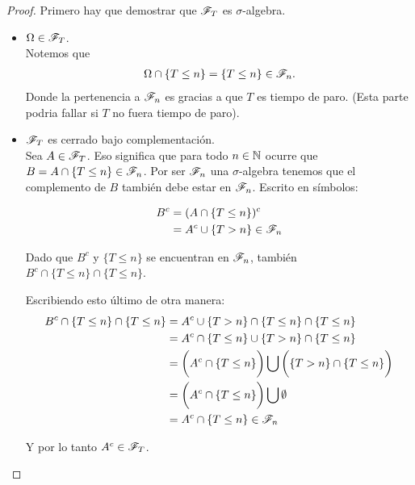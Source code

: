 \begin{proof}
		Primero hay que demostrar que ${\mathscr{F}_T}$ es ${\sigma}$-algebra.\\
		
		\begin{itemize}
			\item ${\Omega \in \mathscr{F}_T}$. \\
			
				Notemos que 
				\begin{align}
					\Omega \cap \{T \leq n\} = \{T \leq n\} \in \mathscr{F}_n.
				\end{align}
				Donde la pertenencia a ${\mathscr{F}_n}$ es gracias a que ${T}$ es tiempo de paro. (Esta parte podria fallar si ${T}$ no fuera tiempo de paro).\\
			
			\item ${\mathscr{F}_T}$ es cerrado bajo complementación.\\
			
				Sea ${A \in \mathscr{F}_T}$. Eso significa que para todo ${n \in  \mathbb{N}}$ ocurre que ${B = A \cap \{ T \leq n \} \in \mathscr{F}_n}$. Por ser ${\mathscr{F}_n}$
								una ${\sigma}$-algebra tenemos que el complemento de ${B}$ también debe estar en ${\mathscr{F}_n}$. Escrito en símbolos:
				
				\begin{align}
					B^c 	&= (A   \cap \{ T \leq n \})^c \\
							&=  A^c \cup \{ T > n \} \in \mathscr{F}_n
				\end{align}
				
				Dado que ${B^c}$ y ${\{ T \leq n \}}$ se encuentran en ${\mathscr{F}_n}$, también ${B^c \cap \{ T \leq n \} \cap \{ T \leq n \}}$.
				
				Escribiendo esto último de otra manera:
				\begin{align}
					B^c \cap \{ T \leq n \} \cap \{ T \leq n \} 	&=		A^c \cup \{ T > n \} \cap \{ T \leq n \} \cap \{ T \leq n \} \\
																	&= 		A^c \cap \{ T \leq n \} \cup \{ T > n \} \cap \{ T \leq n \} \\
																	&= 		\bigg(A^c \cap \{ T \leq n \}\bigg) 
																				\bigcup 
																			\bigg(\{ T > n \} \cap \{ T \leq n \}\bigg) \\
																	&=		\bigg(A^c \cap \{ T \leq n \}\bigg)	\bigcup \emptyset \\
																	&=		A^c \cap \{ T \leq n \} \in \mathscr{F}_n
				\end{align}
				
				Y por lo tanto ${A^c \in \mathscr{F}_T}$.\\
				

\end{itemize}
\end{proof}
